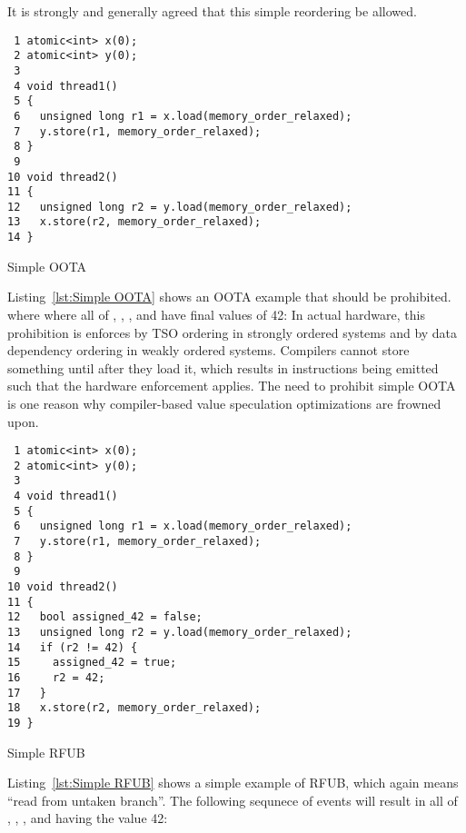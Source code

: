 \documentclass[10]{article}
\begin{document}
It is strongly and generally agreed that this simple reordering be
allowed.

\begin{listing}[tbp]
\begin{verbatim}
 1 atomic<int> x(0);
 2 atomic<int> y(0);
 3
 4 void thread1()
 5 {
 6   unsigned long r1 = x.load(memory_order_relaxed);
 7   y.store(r1, memory_order_relaxed);
 8 }
 9
10 void thread2()
11 {
12   unsigned long r2 = y.load(memory_order_relaxed);
13   x.store(r2, memory_order_relaxed);
14 }
\end{verbatim}
\caption{Simple OOTA}
\label{lst:Simple OOTA}
\end{listing}

Listing~\ref{lst:Simple OOTA} shows an OOTA example that should be
prohibited.
where where all of , , , and  have final values
of 42:
In actual hardware, this prohibition is enforces by TSO ordering in
strongly ordered systems and by data dependency ordering in weakly
ordered systems.
Compilers cannot store something until after they load it, which
results in instructions being emitted such that the hardware enforcement
applies.
The need to prohibit simple OOTA is one reason why compiler-based
value speculation optimizations are frowned upon.


\begin{listing}[tbp]
\begin{verbatim}
 1 atomic<int> x(0);
 2 atomic<int> y(0);
 3
 4 void thread1()
 5 {
 6   unsigned long r1 = x.load(memory_order_relaxed);
 7   y.store(r1, memory_order_relaxed);
 8 }
 9
10 void thread2()
11 {
12   bool assigned_42 = false;
13   unsigned long r2 = y.load(memory_order_relaxed);
14   if (r2 != 42) {
15     assigned_42 = true;
16     r2 = 42;
17   }
18   x.store(r2, memory_order_relaxed);
19 }
\end{verbatim}
\caption{Simple RFUB}
\label{lst:Simple RFUB}
\end{listing}

Listing~\ref{lst:Simple RFUB}
shows a simple example of RFUB, which again means ``read from untaken
branch''.
The following sequnece of events will result in all of , ,
, and  having the value 42:
\end{document}
